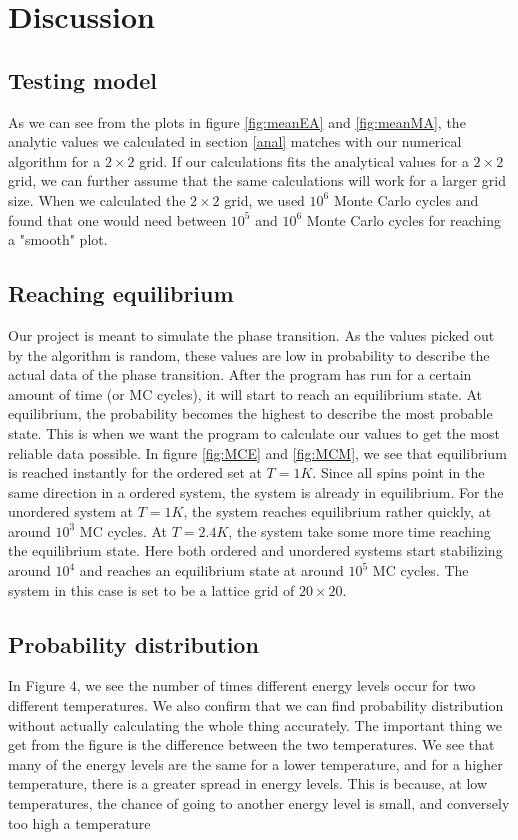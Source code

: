 \documentclass{article}
\begin{document}
\newpage
\section{Discussion}
\subsection{Testing model}
As we can see from the plots in figure \ref{fig:meanEA} and \ref{fig:meanMA}, the analytic values we calculated in section \ref{anal} matches with our numerical algorithm for a $2\times 2$ grid. If our calculations fits the analytical values for a $2\times 2$ grid, we can further assume that the same calculations will work for a larger grid size. When we calculated the $2\times 2$ grid, we used $10^6$ Monte Carlo cycles and found that one would need between $10^5$ and $10^6$ Monte Carlo cycles for reaching a "smooth" plot.

\subsection{Reaching equilibrium}
Our project is meant to simulate the phase transition. As the values picked out by the algorithm is random, these values are low in probability to describe the actual data of the phase transition. After the program has run for a certain amount of time (or MC cycles), it will start to reach an equilibrium state. At equilibrium, the probability becomes the highest to describe the most probable state. This is when we want the program to calculate our values to get the most reliable data possible.
In figure \ref{fig:MCE} and \ref{fig:MCM}, we see that equilibrium is reached instantly for the ordered set at $T = 1K$. Since all spins point in the same direction in a ordered system, the system is already in equilibrium. For the unordered system at $T = 1K$, the system reaches equilibrium rather quickly, at around $10^3$ MC cycles. At $T = 2.4K$, the system take some more time reaching the equilibrium state. Here both ordered and unordered systems start stabilizing around $10^4$ and reaches an equilibrium state at around $10^5$ MC cycles. The system in this case is set to be a lattice grid of $20\times 20$.

\subsection{Probability distribution}
In Figure 4, we see the number of times different energy levels occur for two different temperatures. We also confirm that we can find probability distribution without actually calculating the whole thing accurately. The important thing we get from the figure is the difference between the two temperatures. We see that many of the energy levels are the same for a lower temperature, and for a higher temperature, there is a greater spread in energy levels. This is because, at low temperatures, the chance of going to another energy level is small, and conversely too high a temperature
\end{document}
